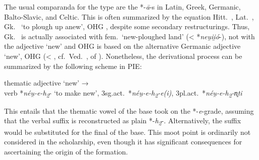 \documentclass[output=paper,colorlinks,citecolor=brown]{langscibook}
\begin{document}
The usual comparanda for the type are the *-\textit{ā}-s in Latin, Greek, Germanic, Balto-Slavic, and Celtic. This is often summarized by the equation Hitt.\ , Lat.\ , Gk.\  ‘to plough up anew’, OHG , despite some secondary restructurings. Thus, Gk.\   is actually associated with  fem.\ ‘new-ploughed land’ (< *\textit{neu̯ii̯ó}-), not with the adjective  ‘new’ and OHG  is based on the alternative Germanic adjective ‘new’, OHG  (< , cf.\  Ved.\  ,  of ). Nonetheless, the derivational process can be summarized by the following scheme in PIE:

\begin{exe}
    \ex thematic adjective  ‘new’ →\\ verb *\textit{néu̯-e-h\textsubscript{2}}- ‘to make new’, 3sg.act.\ *\textit{néu̯-e-h\textsubscript{2}-e(i)}, 3pl.act.\ *\textit{néu̯-e-h\textsubscript{2}-n̥ti} 
\end{exe}



This entails that the thematic vowel of the base took on the *-\textit{e}-grade, assuming that the verbal suffix is reconstructed as plain *-\textit{h\textsubscript{2}}-. Alternatively, the suffix  would be substituted for the final  of the base. This moot point is ordinarily not considered in the scholarship, even though it has significant consequences for ascertaining the origin of the formation. 
\end{document}
